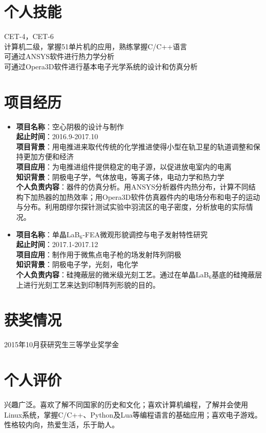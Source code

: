 \documentclass[a4paper]{article}
\begin{document}
\section{个人技能}
CET-4，CET-6\\
计算机二级，掌握51单片机的应用，熟练掌握C/C++语言\\
可通过ANSYS软件进行热力学分析\\
可通过Opera3D软件进行基本电子光学系统的设计和仿真分析 

\section{项目经历}
\begin{itemize}[leftmargin=*]
\item \textbf{项目名称}：空心阴极的设计与制作\\
\textbf{起止时间}：2016.9-2017.10\\
\textbf{项目背景}：用电推进来取代传统的化学推进使得小型在轨卫星的轨道调整和保持更加方便和经济\\
\textbf{项目应用}：为电推进组件提供稳定的电子源，以促进放电室内的电离\\
\textbf{知识背景}：阴极电子学，气体放电，等离子体，电动力学和热力学\\
\textbf{个人负责内容}：器件的仿真分析。用ANSYS分析器件内热分布，计算不同结构下加热器的加热效率；用Opera3D软件仿真器件内的电场分布和电子的运动与分布。利用朗缪尔探针测试实验中羽流区的电子密度，分析放电的实际情况。
\item \textbf{项目名称}：单晶LaB$_6$-FEA微观形貌调控与电子发射特性研究\\
\textbf{起止时间}：2017.1-2017.12\\
\textbf{项目应用}：制作用于微焦点电子枪的场发射阵列阴极\\
\textbf{知识背景}：阴极电子学，光刻，电化学\\
\textbf{个人负责内容}：硅掩蔽层的微米级光刻工艺。通过在单晶LaB$_6$基底的硅掩蔽层上进行光刻工艺来达到印制阵列形貌的目的。
\end{itemize}

\section{获奖情况}
2015年10月获研究生三等学业奖学金

\section{个人评价}
兴趣广泛。喜欢了解不同国家的历史和文化；喜欢计算机编程，了解并会使用Linux系统，掌握C/C++、Python及Lua等编程语言的基础应用；喜欢电子游戏。性格较内向，热爱生活，乐于助人。

\end{document}
